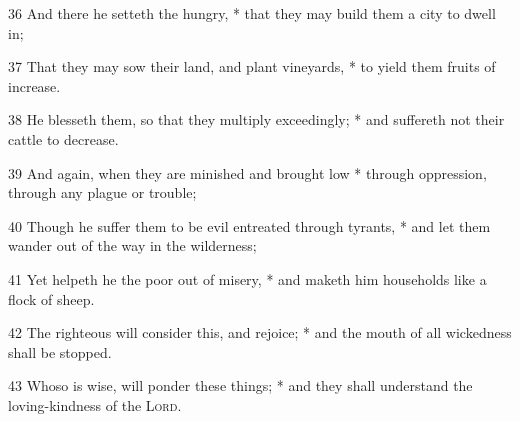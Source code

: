 36 And there he setteth the hungry, * that they may build them a city to dwell in;\par
37 That they may sow their land, and plant vineyards, * to yield them fruits of increase.\par
38 He blesseth them, so that they multiply exceedingly; * and suffereth not their cattle to decrease.\par
39 And again, when they are minished and brought low * through oppression, through any plague or trouble;\par
40 Though he suffer them to be evil entreated through tyrants, * and let them wander out of the way in the wilderness;\par
41 Yet helpeth he the poor out of misery, * and maketh him households like a flock of sheep.\par
42 The righteous will consider this, and rejoice; * and the mouth of all wickedness shall be stopped.\par
43 Whoso is wise, will ponder these things; * and they shall understand the loving-kindness of the {\textsc{Lord}}.
